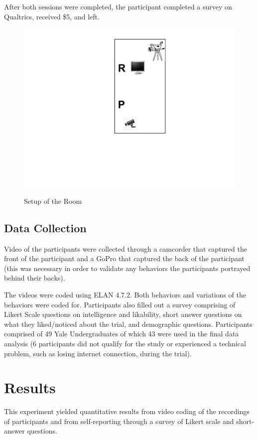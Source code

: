 \documentclass{acm_proc_article-sp}
\begin{document}
After both sessions were completed, the participant completed a survey on Qualtrics, received \$5, and left.

\begin{figure}[t!]
\centering
 \includegraphics[width=1.05\linewidth]{images/setup.jpg}\\
 \caption{Setup of the Room}
 \label{f:bert} %
\end{figure}

\subsection{Data Collection}
Video of the participants were collected through a camcorder that captured the front of the participant and a GoPro that captured the back of the participant (this was necessary in order to validate any behaviors the participants portrayed behind their backs).

The videos were coded using ELAN 4.7.2. Both behaviors and variations of the behaviors were coded for. Participants also filled out a survey comprising of Likert Scale questions on intelligence and likability, short answer questions on what they liked/noticed about the trial, and demographic questions. Participants comprised of 49 Yale Undergraduates of which 43 were used in the final data analysis (6 participants did not qualify for the study or experienced a technical problem, such as losing internet connection, during the trial).

\section{Results}
This experiment yielded quantitative results from video coding of the recordings of participants and from self-reporting through a survey of Likert scale and short-answer questions. 
\end{document}

